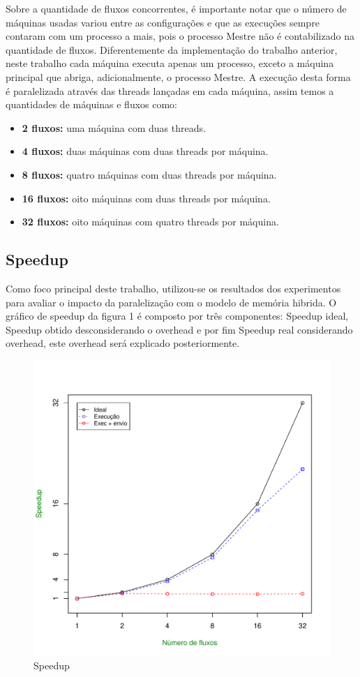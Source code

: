 \documentclass[12pt]{article}
\begin{document}
Sobre a quantidade de fluxos concorrentes, é importante notar que o número de máquinas usadas variou entre as configurações e que as execuções sempre contaram com um processo a mais, pois o processo Mestre não é contabilizado na quantidade de fluxos. Diferentemente da implementação do trabalho anterior, neste trabalho cada máquina executa apenas um processo, exceto a máquina principal que abriga, adicionalmente, o processo Mestre. A execução desta forma é paralelizada através das threads lançadas em cada máquina, assim temos a quantidades de máquinas e fluxos como: 

\begin{itemize}
\item \textbf{2 fluxos:} uma máquina com duas threads.
\item \textbf{4 fluxos:} duas máquinas com duas threads por máquina.
\item \textbf{8 fluxos:} quatro máquinas com duas threads por máquina.
\item \textbf{16 fluxos:} oito máquinas com duas threads por máquina.
\item \textbf{32 fluxos:} oito máquinas com quatro threads por máquina.
\end{itemize}

\newpage
\subsection{Speedup}

Como foco principal deste trabalho, utilizou-se os resultados dos experimentos para avaliar o impacto da paralelização com o modelo de memória hibrida. O gráfico de speedup da figura 1 é composto por três componentes: Speedup ideal, Speedup obtido desconsiderando o overhead e por fim Speedup real considerando overhead, este overhead será explicado posteriormente.

\begin{figure}[ht!]
\centering
\includegraphics[width=.6\textwidth]{sp.pdf}
\caption{Speedup}
\label{fig:exampleFig1}
\end{figure}
\end{document}
